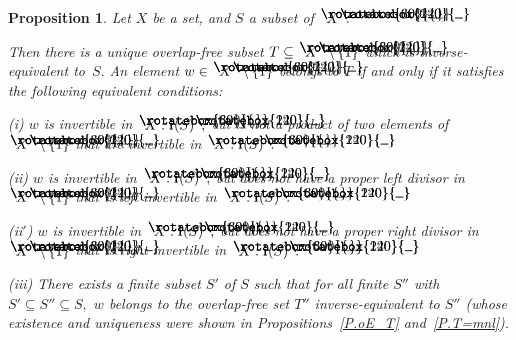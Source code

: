 \documentclass{amsart}
\newtheorem{proposition}[equation]{Proposition}
\numberwithin{equation}{section}
\newcommand{\I}{\mathbf{i}\hspace{.05em}}
\newcommand{\langl}{\begin{picture}(.51em,1em)
\put(.11em,.33em){\rotatebox{60}{\line(1,0){.55em}}}
\put(.11em,.33em){\rotatebox{300}{\line(1,0){.55em}}}
\end{picture}}
\newcommand{\rangl}{\begin{picture}(.5em,1em)
\put(.09em,.33em){\rotatebox{120}{\line(1,0){.55em}}}
\put(.09em,.33em){\rotatebox{240}{\line(1,0){.55em}}}
\end{picture}}
\begin{document}
\begin{proposition}\label{P.inv_gen}
Let $X$ be a set, and $S$ a subset of $\langl X\rangl.$

Then there is a unique overlap-free subset
$T\subseteq \langl X\rangl\setminus\{1\}$ which is
inverse-equivalent to~$S.$
An element $w\in\langl X\rangl\setminus\{1\}$ belongs to $T$ if and
only if it satisfies the following equivalent conditions:\vspace{.3em}

{\rm(i)} $w$ is invertible in $\langl X:\I(S)\rangl,$ but
is not a product of two elements of $\langl X\rangl\setminus\{1\}$
that are invertible in $\langl X:\I(S)\rangl.$\vspace{.3em}

{\rm(ii)} $w$ is invertible in $\langl X:\I(S)\rangl,$ but
does not have a proper left divisor in $\langl X\rangl\setminus\{1\}$
that is left invertible in $\langl X:\I(S)\rangl.$\vspace{.3em}

{\rm(ii$\!'\!$)} $w$ is invertible in $\langl X:\I(S)\rangl,$ but
does not have a proper right divisor in $\langl X\rangl\setminus\{1\}$
that is right invertible in $\langl X:\I(S)\rangl.$\vspace{.3em}

{\rm(iii)}  There exists a finite subset $S'$ of $S$ such that
for all finite $S''$ with $S'\subseteq S''\subseteq S,$
$w$ belongs to the overlap-free set $T''$ inverse-equivalent
to $S''$ {\rm(}whose existence and uniqueness were shown in
Propositions~\ref{P.oE_T} and~\ref{P.T=mnl}{\rm)}.
\end{proposition}
\end{document}
